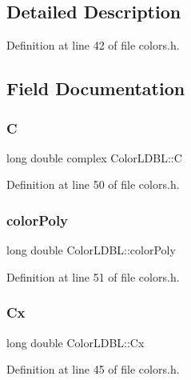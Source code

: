 \subsection{Detailed Description}


Definition at line 42 of file colors.\+h.



\subsection{Field Documentation}
\mbox{\label{struct_color_l_d_b_l_a7ba2fec21e5a08b5f292d33ab9cf9a3c}} 
\subsubsection{\texorpdfstring{C}{C}}
{\footnotesize\ttfamily long double complex Color\+L\+D\+B\+L\+::C}



Definition at line 50 of file colors.\+h.

\mbox{\label{struct_color_l_d_b_l_ab83bc1e6d6d0590aa7b5a539cc66c3e2}} 
\subsubsection{\texorpdfstring{color\+Poly}{colorPoly}}
{\footnotesize\ttfamily long double Color\+L\+D\+B\+L\+::color\+Poly}



Definition at line 51 of file colors.\+h.

\mbox{\label{struct_color_l_d_b_l_a9f083a843499dd55048426903ba90f6f}} 
\subsubsection{\texorpdfstring{Cx}{Cx}}
{\footnotesize\ttfamily long double Color\+L\+D\+B\+L\+::\+Cx}



Definition at line 45 of file colors.\+h.

